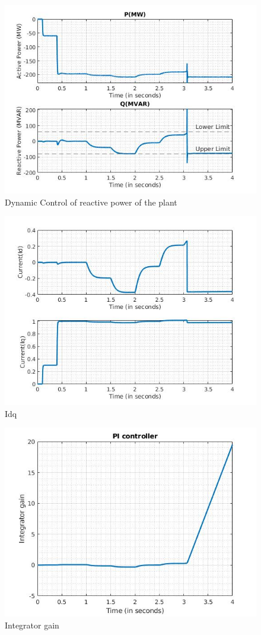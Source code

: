 \begin{figure}[H]
    \centering
        \includegraphics[width=0.5 \linewidth]{images_a7/dynamic_control.jpg}
        \caption{Dynamic Control of reactive power of the plant}
        \label{fig:Dynamic_control}   
\end{figure}
\begin{figure}[H]
    \centering
        \includegraphics[width=0.5 \linewidth]{images_a7/Idq.jpg}
        \caption{Idq}
        \label{fig:Idq}   
\end{figure}
\begin{figure}[H]
    \centering
        \includegraphics[width=0.5 \linewidth]{images_a7/PI.jpg}
        \caption{Integrator gain}
        \label{fig:PI}   
\end{figure}

